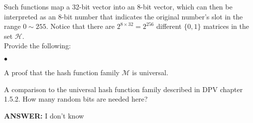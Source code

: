 \documentclass{article}
\newenvironment{myitem}{\begin{list}{$\bullet$}
{\setlength{\itemsep}{-0pt}
\setlength{\topsep}{0pt}
\setlength{\labelwidth}{0pt}
\setlength{\leftmargin}{10pt}
\setlength{\parsep}{-0pt}
\setlength{\itemsep}{0pt}
\setlength{\partopsep}{0pt}}}%
{\end{list}}
\begin{document}
\noindent Such functions map a 32-bit vector into an 8-bit vector,
which can then be interpreted as an 8-bit number that indicates the
original number's slot in the range $0 \sim 255$. Notice that there
are $2^{8\times32}=2^{256}$ different $\{0,1\}$ matrices in the set
$\mathcal{H}$.\\

\noindent Provide the following:
\begin{myitem}
\item A proof that the hash function family $\mathcal{M}$ is
  universal.

\item A comparison to the universal hash function family described in
  DPV chapter 1.5.2. How many random bits are needed here?\\
\end{myitem}

{\bfseries ANSWER: }I don't know\\
\end{document}
